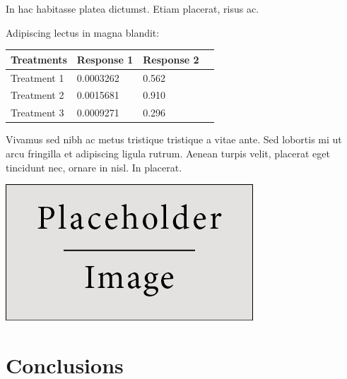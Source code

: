 \documentclass[a0,landscape]{a0poster}
\begin{document}
\begin{multicols}{3}
In hac habitasse platea dictumst. Etiam placerat, risus ac.

Adipiscing lectus in magna blandit:

\begin{center}\vspace{1cm}
\begin{tabular}{l l l l}
\toprule
\textbf{Treatments} & \textbf{Response 1} & \textbf{Response 2} \\
\midrule
Treatment 1 & 0.0003262 & 0.562 \\
Treatment 2 & 0.0015681 & 0.910 \\
Treatment 3 & 0.0009271 & 0.296 \\
\bottomrule
\end{tabular}
\end{center}\vspace{1cm}

Vivamus sed nibh ac metus tristique tristique a vitae ante. Sed lobortis mi ut arcu fringilla et adipiscing ligula rutrum. Aenean turpis velit, placerat eget tincidunt nec, ornare in nisl. In placerat.

\begin{center}\vspace{1cm}
\includegraphics[width=0.8\linewidth]{placeholder}
\end{center}\vspace{1cm}


\color{SaddleBrown} %

\section*{Conclusions}


\end{multicols}
\end{document}
